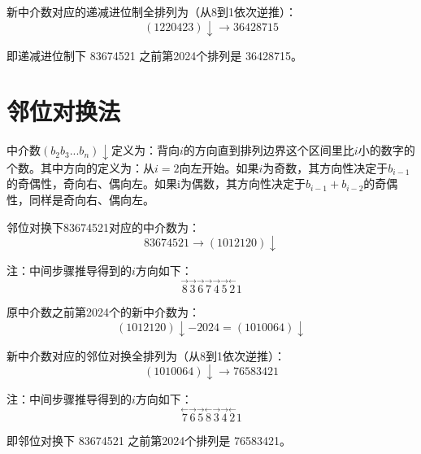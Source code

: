 \documentclass[12pt]{article}
\begin{document}
新中介数对应的递减进位制全排列为（从8到1依次逆推）：
\[(1220423)\downarrow \rightarrow 36428715\]

即递减进位制下 83674521 之前第2024个排列是 36428715。

\section*{邻位对换法}

中介数$(b_{2}b_{3}...b_{n})\downarrow$定义为：背向$i$的方向直到排列边界这个区间里比$i$小的数字的个数。其中方向的定义为：从$i=2$向左开始。如果$i$为奇数，其方向性决定于$b_{i-1}$的奇偶性，奇向右、偶向左。如果i为偶数，其方向性决定于$b_{i-1}+b_{i-2}$的奇偶性，同样是奇向右、偶向左。

邻位对换下83674521对应的中介数为：
\[83674521 \rightarrow (1012120)\downarrow\]

注：中间步骤推导得到的$i$方向如下：
\[\overset{\rightarrow}{8}\overset{\rightarrow}{3}\overset{\rightarrow}{6}\overset{\rightarrow}{7}\overset{\rightarrow}{4}\overset{\rightarrow}{5}\overset{\leftarrow}{2}1\]

原中介数之前第2024个的新中介数为：
\[(1012120)\downarrow -2024 = (1010064)\downarrow\]

新中介数对应的邻位对换全排列为（从8到1依次逆推）：
\[(1010064)\downarrow \rightarrow 76583421\]

注：中间步骤推导得到的$i$方向如下：
\[\overset{\leftarrow}{7}\overset{\rightarrow}{6}\overset{\rightarrow}{5}\overset{\leftarrow}{8}\overset{\rightarrow}{3}\overset{\rightarrow}{4}\overset{\leftarrow}{2}1\]

即邻位对换下 83674521 之前第2024个排列是 76583421。
\end{document}
